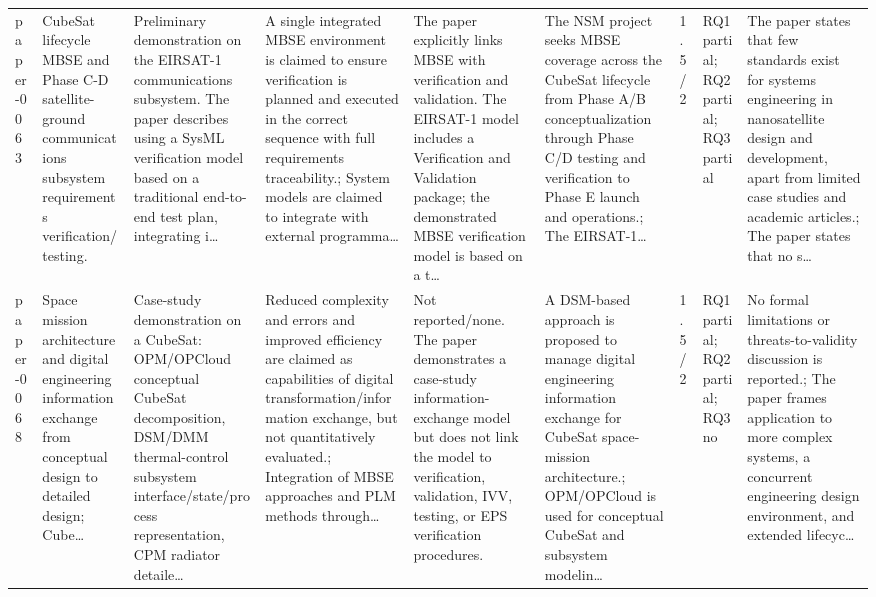 \documentclass[10pt]{article}
\begin{document}
\begin{landscape}
\begin{longtable}{p{1.0cm}p{2.4cm}p{3.1cm}p{3.7cm}p{3.4cm}p{3.1cm}p{1.0cm}p{1.8cm}p{3.4cm}}
paper-0063 & CubeSat lifecycle MBSE and Phase C-D satellite-ground communications subsystem requirements verification/testing. & Preliminary demonstration on the EIRSAT-1 communications subsystem. The paper describes using a SysML verification model based on a traditional end-to-end test plan, integrating i… & A single integrated MBSE environment is claimed to ensure verification is planned and executed in the correct sequence with full requirements traceability.; System models are claimed to integrate with external programma… & The paper explicitly links MBSE with verification and validation. The EIRSAT-1 model includes a Verification and Validation package; the demonstrated MBSE verification model is based on a t… & The NSM project seeks MBSE coverage across the CubeSat lifecycle from Phase A/B conceptualization through Phase C/D testing and verification to Phase E launch and operations.; The EIRSAT-1… & 1.5/2 & RQ1 partial; RQ2 partial; RQ3 partial & The paper states that few standards exist for systems engineering in nanosatellite design and development, apart from limited case studies and academic articles.; The paper states that no s… \\
paper-0068 & Space mission architecture and digital engineering information exchange from conceptual design to detailed design; Cube… & Case-study demonstration on a CubeSat: OPM/OPCloud conceptual CubeSat decomposition, DSM/DMM thermal-control subsystem interface/state/process representation, CPM radiator detaile… & Reduced complexity and errors and improved efficiency are claimed as capabilities of digital transformation/information exchange, but not quantitatively evaluated.; Integration of MBSE approaches and PLM methods through… & Not reported/none. The paper demonstrates a case-study information-exchange model but does not link the model to verification, validation, IVV, testing, or EPS verification procedures. & A DSM-based approach is proposed to manage digital engineering information exchange for CubeSat space-mission architecture.; OPM/OPCloud is used for conceptual CubeSat and subsystem modelin… & 1.5/2 & RQ1 partial; RQ2 partial; RQ3 no & No formal limitations or threats-to-validity discussion is reported.; The paper frames application to more complex systems, a concurrent engineering design environment, and extended lifecyc… \\

\end{longtable}
\end{landscape}
\end{document}
